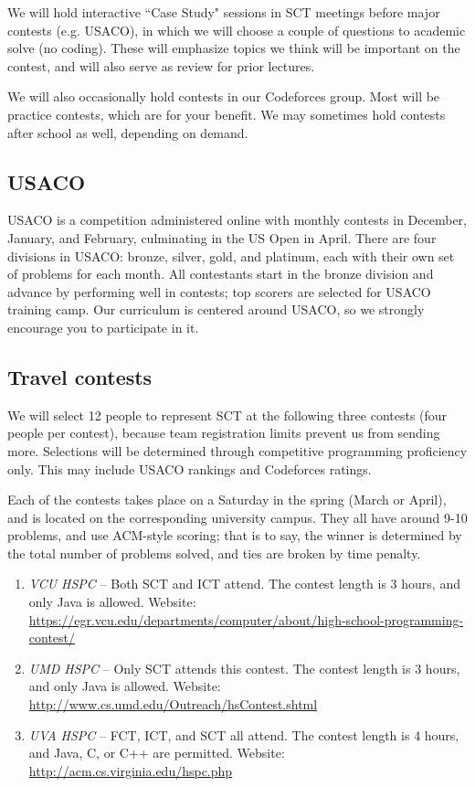 \documentclass{article}
\begin{document}
We will hold interactive ``Case Study" sessions in SCT meetings before major contests (e.g. USACO), in which we will choose a couple of questions to academic solve (no coding). These will emphasize topics we think will be important on the contest, and will also serve as review for prior lectures.

We will also occasionally hold contests in our Codeforces group. Most will be practice contests, which are for your benefit. We may sometimes hold contests after school as well, depending on demand.

\subsection{USACO}

USACO is a competition administered online with monthly contests in December, January, and February, culminating in the US Open in April. There are four divisions in USACO: bronze, silver, gold, and platinum, each with their own set of problems for each month. All contestants start in the bronze division and advance by performing well in contests; top scorers are selected for USACO training camp. Our curriculum is centered around USACO, so we strongly encourage you to participate in it.


\subsection{Travel contests}

We will select 12 people to represent SCT at the following three contests (four people per contest), because team registration limits prevent us from sending more. Selections will be determined through competitive programming proficiency only. This may include USACO rankings and Codeforces ratings.

Each of the contests takes place on a Saturday in the spring (March or April), and is located on the corresponding university campus. They all have around 9-10 problems, and use ACM-style scoring; that is to say, the winner is determined by the total number of problems solved, and ties are broken by time penalty.

\begin{enumerate}
    \item \textit{VCU HSPC} --
    Both SCT and ICT attend. The contest length is 3 hours, and only Java is allowed.
    Website: \url{https://egr.vcu.edu/departments/computer/about/high-school-programming-contest/}

    \item \textit{UMD HSPC} --
    Only SCT attends this contest. The contest length is 3 hours, and only Java is allowed.
    Website:
    \url{http://www.cs.umd.edu/Outreach/hsContest.shtml}
    
    \item \textit{UVA HSPC} --
    FCT, ICT, and SCT all attend. The contest length is 4 hours, and Java, C, or C++ are permitted.
    Website: \url{http://acm.cs.virginia.edu/hspc.php}
\end{enumerate}
\end{document}
